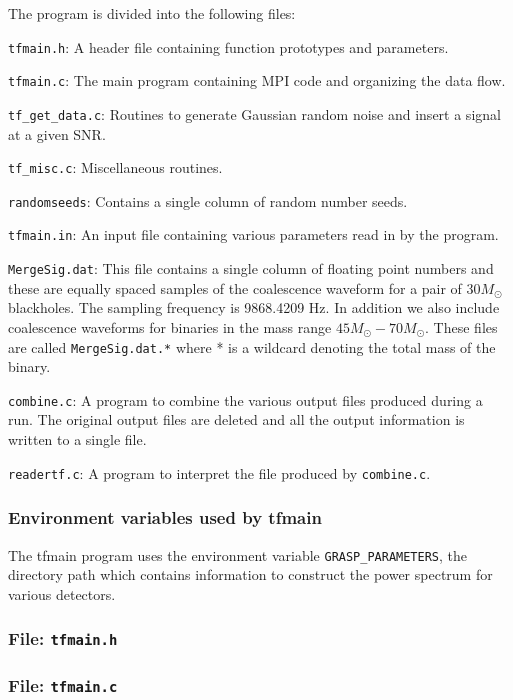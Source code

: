 The program is divided into the following files:
\begin{description}
\item{\tt tfmain.h}: A header file containing function prototypes and
parameters.
\item{\tt tfmain.c}: The main program containing MPI code and
organizing the data flow.
\item{\tt tf\_get\_data.c}: Routines to  generate Gaussian random noise and
insert a signal at a given SNR.
\item{\tt tf\_misc.c}: Miscellaneous routines.
\item{\tt randomseeds}: Contains a single column  of random number seeds.
\item{\tt tfmain.in}: An input file containing various parameters read in by the program.
\item{\tt MergeSig.dat}: This file contains a single column of floating
point numbers and these are equally spaced samples of the coalescence
waveform for a pair of $30M_\odot$ blackholes. The sampling frequency
is 9868.4209 Hz. In addition we also include coalescence waveforms for
binaries in the mass range  $45M_\odot - 70M_\odot$. These files are
called {\tt MergeSig.dat.*} where * is a wildcard denoting the total
mass of the binary.
\item{\tt combine.c}: A program to combine the various output
files produced during a run. The original output files are deleted and
all the output information is written to a single file.
\item{\tt readertf.c}: A program to interpret the file produced by 
{\tt combine.c}. 
\end{description}

\subsubsection{Environment variables used by tfmain} 

The tfmain program uses the environment variable 
{\tt GRASP\_PARAMETERS}, the directory path which contains information
to construct the power spectrum for various detectors.

\newpage
\subsubsection{File: \tt tfmain.h}

\newpage
\subsubsection{File: \tt tfmain.c}

